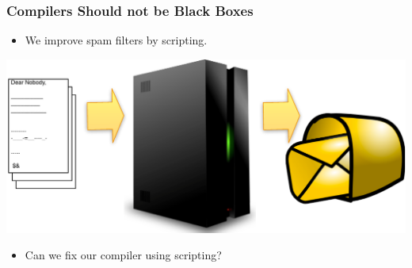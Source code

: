 \begin{frame}[verbatim]
\frametitle{Compilers Should not be Black Boxes}

\begin{itemize}
\item We improve spam filters by scripting.
\end{itemize}

\includegraphics[width=\textwidth]{Pictures/Spam.pdf}

\begin{itemize}
\item Can we fix our compiler using scripting?
\end{itemize}

\end{frame}

